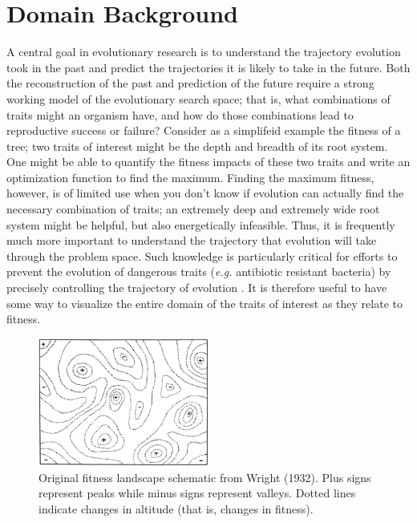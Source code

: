 \section{Domain Background}
A central goal in evolutionary research is to understand the trajectory evolution took in the past and predict the trajectories it is likely to take in the future. 
Both the reconstruction of the past and prediction of the future require a strong working model of the evolutionary search space; that is, what combinations of traits might an organism have, and how do those combinations lead to reproductive success or failure? 
Consider as a simplifeid example the fitness of a tree; two traits of interest might be the depth and breadth of its root system.
One might be able to quantify the fitness impacts of these two traits and write an optimization function to find the maximum. 
Finding the maximum fitness, however, is of limited use when you don't know if evolution can actually find the necessary combination of traits; an extremely deep and extremely wide root system might be helpful, but also energetically infeasible.
Thus, it is frequently much more important to understand the trajectory that evolution will take through the problem space.
Such knowledge is particularly critical for efforts to prevent the evolution of dangerous traits (\textit{e.g.} antibiotic resistant bacteria) by precisely controlling the trajectory of evolution \citep{iram_controlling_2021}.
It is therefore useful to have some way to visualize the entire domain of the traits of interest as they relate to fitness.

\begin{figure}
    \centering
    \includegraphics[width=0.5\textwidth]{chapters/3-vr-viz/figs/wright.png}
    \caption{Original fitness landscape schematic from Wright (1932). Plus signs represent peaks while minus signs represent valleys. Dotted lines indicate changes in altitude (that is, changes in fitness).}
    \label{fig:bkg:wright}
\end{figure}


